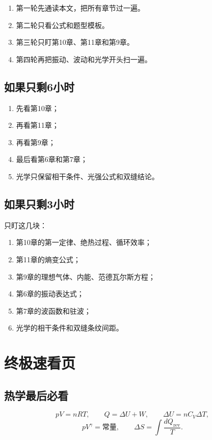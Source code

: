 \documentclass[12pt,a4paper]{article}
\begin{document}
\begin{enumerate}
  \item 第一轮先通读本文，把所有章节过一遍。
  \item 第二轮只看公式和题型模板。
  \item 第三轮只盯第10章、第11章和第9章。
  \item 第四轮再把振动、波动和光学开头扫一遍。
\end{enumerate}

\subsection{如果只剩6小时}

\begin{enumerate}
  \item 先看第10章；
  \item 再看第11章；
  \item 再看第9章；
  \item 最后看第6章和第7章；
  \item 光学只保留相干条件、光强公式和双缝结论。
\end{enumerate}

\subsection{如果只剩3小时}

只盯这几块：

\begin{enumerate}
  \item 第10章的第一定律、绝热过程、循环效率；
  \item 第11章的熵变公式；
  \item 第9章的理想气体、内能、范德瓦尔斯方程；
  \item 第6章的振动表达式；
  \item 第7章的波函数和驻波；
  \item 光学的相干条件和双缝条纹间距。
\end{enumerate}

\section{终极速看页}

\subsection*{热学最后必看}

\[
pV=nRT,\qquad
Q=\Delta U + W,\qquad
\Delta U=nC_V\Delta T,
\]
\[
pV^\gamma=\text{常量},\qquad
\Delta S=\int \frac{dQ_{\mathrm{rev}}}{T}.
\]
\end{document}
